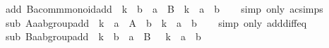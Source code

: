 \begin{isabellebody}
\isanewline
%
\endisadelimproof
\isanewline
{}\isamarkupfalse%
\ add{}{\isacharcolon}{\kern0pt}\ {\isachardoublequoteopen}{\isacharparenleft}{\kern0pt}B{\isacharcolon}{\kern0pt}{\isacharcolon}{\kern0pt}{\isacharprime}{\kern0pt}a{\isacharcolon}{\kern0pt}{\isacharcolon}{\kern0pt}comm{\isacharunderscore}{\kern0pt}monoid{\isacharunderscore}{\kern0pt}add{\isacharparenright}{\kern0pt}\ {\isasymequiv}\ k\ {\isacharplus}{\kern0pt}\ b\ {\isasymLongrightarrow}\ a\ {\isacharplus}{\kern0pt}\ B\ {\isasymequiv}\ k\ {\isacharplus}{\kern0pt}\ {\isacharparenleft}{\kern0pt}a\ {\isacharplus}{\kern0pt}\ b{\isacharparenright}{\kern0pt}{\isachardoublequoteclose}\isanewline
%
\isadelimproof
\ \ %
\endisadelimproof
%
\isatagproof
{}\isamarkupfalse%
\ {\isacharparenleft}{\kern0pt}simp\ only{\isacharcolon}{\kern0pt}\ ac{\isacharunderscore}{\kern0pt}simps{\isacharparenright}{\kern0pt}%
\endisatagproof
{\isafoldproof}%
%
\isadelimproof
\isanewline
%
\endisadelimproof
\isanewline
{}\isamarkupfalse%
\ sub{}{\isacharcolon}{\kern0pt}\ {\isachardoublequoteopen}{\isacharparenleft}{\kern0pt}A{\isacharcolon}{\kern0pt}{\isacharcolon}{\kern0pt}{\isacharprime}{\kern0pt}a{\isacharcolon}{\kern0pt}{\isacharcolon}{\kern0pt}ab{\isacharunderscore}{\kern0pt}group{\isacharunderscore}{\kern0pt}add{\isacharparenright}{\kern0pt}\ {\isasymequiv}\ k\ {\isacharplus}{\kern0pt}\ a\ {\isasymLongrightarrow}\ A\ {\isacharminus}{\kern0pt}\ b\ {\isasymequiv}\ k\ {\isacharplus}{\kern0pt}\ {\isacharparenleft}{\kern0pt}a\ {\isacharminus}{\kern0pt}\ b{\isacharparenright}{\kern0pt}{\isachardoublequoteclose}\isanewline
%
\isadelimproof
\ \ %
\endisadelimproof
%
\isatagproof
{}\isamarkupfalse%
\ {\isacharparenleft}{\kern0pt}simp\ only{\isacharcolon}{\kern0pt}\ add{\isacharunderscore}{\kern0pt}diff{\isacharunderscore}{\kern0pt}eq{\isacharparenright}{\kern0pt}%
\endisatagproof
{\isafoldproof}%
%
\isadelimproof
\isanewline
%
\endisadelimproof
\isanewline
{}\isamarkupfalse%
\ sub{}{\isacharcolon}{\kern0pt}\ {\isachardoublequoteopen}{\isacharparenleft}{\kern0pt}B{\isacharcolon}{\kern0pt}{\isacharcolon}{\kern0pt}{\isacharprime}{\kern0pt}a{\isacharcolon}{\kern0pt}{\isacharcolon}{\kern0pt}ab{\isacharunderscore}{\kern0pt}group{\isacharunderscore}{\kern0pt}add{\isacharparenright}{\kern0pt}\ {\isasymequiv}\ k\ {\isacharplus}{\kern0pt}\ b\ {\isasymLongrightarrow}\ a\ {\isacharminus}{\kern0pt}\ B\ {\isasymequiv}\ {\isacharminus}{\kern0pt}\ k\ {\isacharplus}{\kern0pt}\ {\isacharparenleft}{\kern0pt}a\ {\isacharminus}{\kern0pt}\ b{\isacharparenright}{\kern0pt}{\isachardoublequoteclose}\isanewline

\end{isabellebody}
